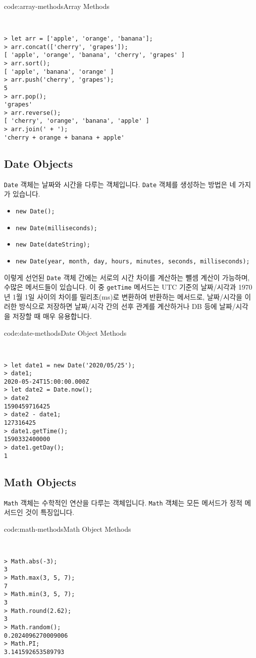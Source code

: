 \begin{codeenv}{code:array-methods}{Array Methods}\begin{verbatim}


> let arr = ['apple', 'orange', 'banana'];
> arr.concat(['cherry', 'grapes']);
[ 'apple', 'orange', 'banana', 'cherry', 'grapes' ]
> arr.sort();
[ 'apple', 'banana', 'orange' ]
> arr.push('cherry', 'grapes');
5
> arr.pop();
'grapes'
> arr.reverse();
[ 'cherry', 'orange', 'banana', 'apple' ]
> arr.join(' + ');
'cherry + orange + banana + apple'
\end{verbatim}
\end{codeenv}

\subsection*{Date Objects}

\texttt{Date} 객체는 날짜와 시간을 다루는 객체입니다. \texttt{Date} 객체를 생성하는 방법은 네 가지가 있습니다.

\begin{itemize}
    \item \texttt{new Date();}
    \item \texttt{new Date(milliseconds);}
    \item \texttt{new Date(dateString);}
    \item \texttt{new Date(year, month, day, hours, minutes, seconds, milliseconds);}
\end{itemize}

이렇게 선언된 \texttt{Date} 객체 간에는 서로의 시간 차이를 계산하는 뺄셈 계산이 가능하며, 수많은 메서드들이 있습니다. 이 중 \texttt{getTime} 메서드는 UTC 기준의 날짜/시각과 1970년 1월 1일 사이의 차이를 밀리초(ms)로 변환하여 반환하는 메서드로, 날짜/시각을 이러한 방식으로 저장하면 날짜/시각 간의 선후 관계를 계산하거나 DB 등에 날짜/시각을 저장할 때 매우 유용합니다. 

\begin{codeenv}{code:date-methods}{Date Object Methods}\begin{verbatim}


> let date1 = new Date('2020/05/25');
> date1;
2020-05-24T15:00:00.000Z
> let date2 = Date.now();
> date2
1590459716425
> date2 - date1;
127316425
> date1.getTime();
1590332400000
> date1.getDay();
1
\end{verbatim}
\end{codeenv}

\subsection*{Math Objects}

\texttt{Math} 객체는 수학적인 연산을 다루는 객체입니다. \texttt{Math} 객체는 모든 메서드가 정적 메서드인 것이 특징입니다. 

\begin{codeenv}{code:math-methods}{Math Object Methods}\begin{verbatim}


> Math.abs(-3);
3
> Math.max(3, 5, 7);
7
> Math.min(3, 5, 7);
3
> Math.round(2.62);
3
> Math.random();
0.2024096270009006
> Math.PI;
3.141592653589793
\end{verbatim}
\end{codeenv}
